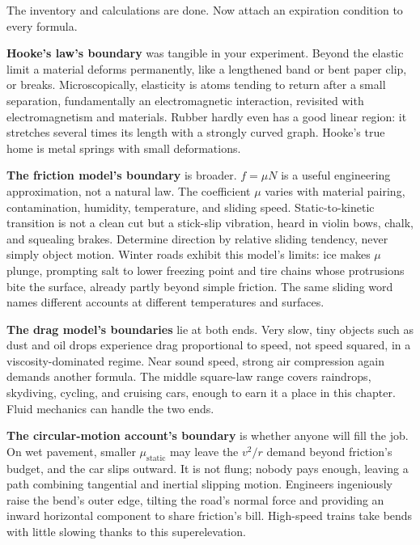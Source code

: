 
The inventory and calculations are done. Now attach an expiration condition to every formula.

\textbf{Hooke's law's boundary} was tangible in your experiment. Beyond the elastic limit a material deforms permanently, like a lengthened band or bent paper clip, or breaks. Microscopically, elasticity is atoms tending to return after a small separation, fundamentally an electromagnetic interaction, revisited with electromagnetism and materials. Rubber hardly even has a good linear region: it stretches several times its length with a strongly curved graph. Hooke's true home is metal springs with small deformations.

\textbf{The friction model's boundary} is broader. \(f=\mu N\) is a useful engineering approximation, not a natural law. The coefficient \(\mu\) varies with material pairing, contamination, humidity, temperature, and sliding speed. Static-to-kinetic transition is not a clean cut but a stick-slip vibration, heard in violin bows, chalk, and squealing brakes. Determine direction by relative sliding tendency, never simply object motion. Winter roads exhibit this model's limits: ice makes \(\mu\) plunge, prompting salt to lower freezing point and tire chains whose protrusions bite the surface, already partly beyond simple friction. The same sliding word names different accounts at different temperatures and surfaces.

\textbf{The drag model's boundaries} lie at both ends. Very slow, tiny objects such as dust and oil drops experience drag proportional to speed, not speed squared, in a viscosity-dominated regime. Near sound speed, strong air compression again demands another formula. The middle square-law range covers raindrops, skydiving, cycling, and cruising cars, enough to earn it a place in this chapter. Fluid mechanics can handle the two ends.

\textbf{The circular-motion account's boundary} is whether anyone will fill the job. On wet pavement, smaller \(\mu_{\text{static}}\) may leave the \(v^2/r\) demand beyond friction's budget, and the car slips outward. It is not flung; nobody pays enough, leaving a path combining tangential and inertial slipping motion. Engineers ingeniously raise the bend's outer edge, tilting the road's normal force and providing an inward horizontal component to share friction's bill. High-speed trains take bends with little slowing thanks to this superelevation.


